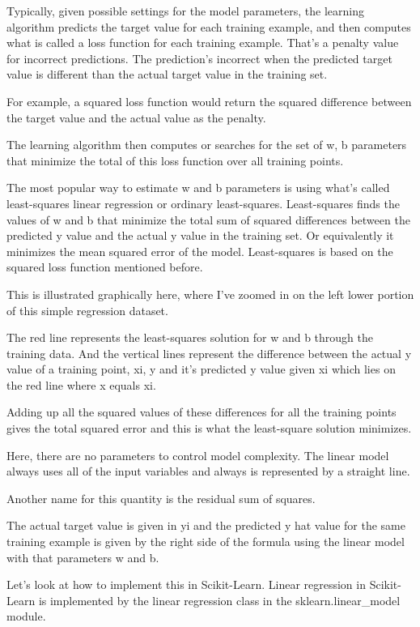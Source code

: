 \begin{multicols}{2}
Typically, given possible settings for the model parameters, the learning algorithm predicts the target value for each training example, and then computes what is called a loss function for each training example. That's a penalty value for incorrect predictions. The prediction's incorrect when the predicted target value is different than the actual target value in the training set. 

For example, a squared loss function would return the squared difference between the target value and the actual value as the penalty. 

The learning algorithm then computes or searches for the set of w, b parameters that minimize the total of this loss function over all training points. 

The most popular way to estimate w and b parameters is using what's called least-squares linear regression or ordinary least-squares. Least-squares finds the values of w and b that minimize the total sum of squared differences between the predicted y value and the actual y value in the training set. Or equivalently it minimizes the mean squared error of the model. Least-squares is based on the squared loss function mentioned before. 

This is illustrated graphically here, where I've zoomed in on the left lower portion of this simple regression dataset. 

The red line represents the least-squares solution for w and b through the training data. And the vertical lines represent the difference between the actual y value of a training point, xi, y and it's predicted y value given xi which lies on the red line where x equals xi. 

Adding up all the squared values of these differences for all the training points gives the total squared error and this is what the least-square solution minimizes. 

Here, there are no parameters to control model complexity. The linear model always uses all of the input variables and always is represented by a straight line. 

Another name for this quantity is the residual sum of squares. 

The actual target value is given in yi and the predicted y hat value for the same training example is given by the right side of the formula using the linear model with that parameters w and b. 

Let's look at how to implement this in Scikit-Learn. Linear regression in Scikit-Learn is implemented by the linear regression class in the sklearn.linear_model module. 


\end{multicols}
